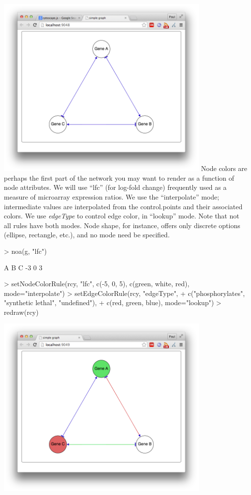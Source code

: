 \documentclass{article}
\begin{document}
\includegraphics[width=0.8\textwidth]{fig1.png}
Node colors are perhaps the first part of the network you may want to render as a function of node attributes.
We will use ``lfc'' (for log-fold change) frequently used as a measure of microarray expression ratios.
We use the ``interpolate'' mode; intermediate values are interpolated from the control.points and their
associated colors.   We use \emph{edgeType} to control edge color, in ``lookup'' mode.  Note that not all
rules have both modes.  Node shape, for instance, offers only discrete options (ellipse, rectangle, etc.),
and no mode need be specified.
\begin{Schunk}
\begin{Sinput}
> noa(g, "lfc")
\end{Sinput}
\begin{Soutput}
 A  B  C 
-3  0  3 
\end{Soutput}
\begin{Sinput}
> setNodeColorRule(rcy, "lfc", c(-5, 0, 5), c(green, white, red), mode="interpolate")
> setEdgeColorRule(rcy, "edgeType",
+                  c("phosphorylates", "synthetic lethal", "undefined"),
+                  c(red, green, blue), mode="lookup")
> redraw(rcy)
\end{Sinput}
\end{Schunk}
\includegraphics[width=0.8\textwidth]{fig2.png}
\end{document}
